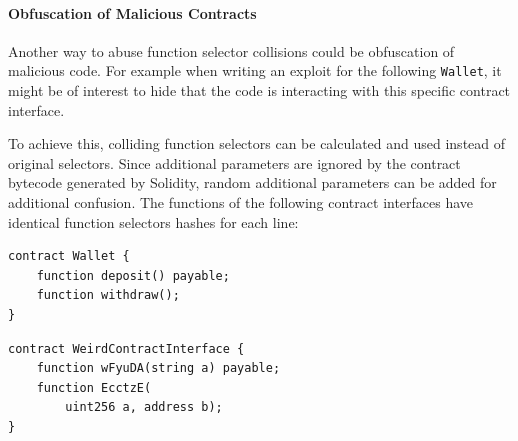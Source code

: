 \paragraph{Obfuscation of Malicious Contracts}
Another way to abuse function selector collisions could be obfuscation of malicious code. For example when writing an exploit for the following \texttt{Wallet}, it might be of interest to hide that the code is interacting with this specific contract interface.

To achieve this, colliding function selectors can be calculated and used instead of original selectors. Since additional parameters are ignored by the contract bytecode generated by Solidity, random additional parameters can be added for additional confusion. The functions of the following contract interfaces have identical function selectors hashes for each line:

\begin{multicols}{2}
	\begin{verbatim}
contract Wallet {
    function deposit() payable;
    function withdraw();
}
\end{verbatim}

	\begin{verbatim}
contract WeirdContractInterface {
    function wFyuDA(string a) payable;
    function EcctzE(
        uint256 a, address b);
}
\end{verbatim}
\end{multicols}

